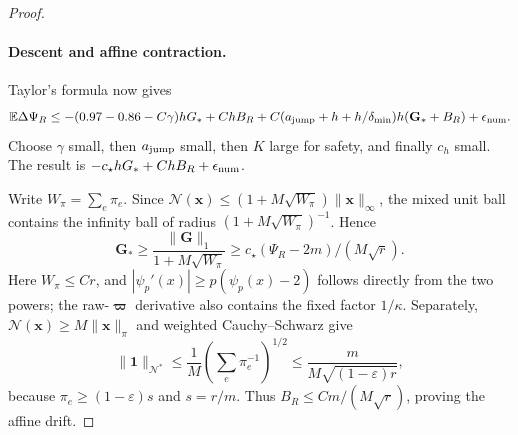 \documentclass[11pt]{article}
\theoremstyle{remark}
\newcommand{\vvp}{\boldsymbol{\varpi}}
\newcommand{\GG}{\mathbf G}
\newcommand{\xx}{\mathbf x}
\newcommand{\Ex}{\mathbb E}
\newcommand{\norm}[1]{\lVert#1\rVert}
\begin{document}
\begin{proof}
\paragraph{Descent and affine contraction.} Taylor's formula now gives
\[
 \Ex\Delta\Psi_R
 \le-(0.97-0.86-C\gamma)hG_*+ChB_R
      +C(a_{\rm jump}+h+h/\delta_{\min})h(\GG_*+B_R)
      +\epsilon_{\rm num}.
\]
Choose $\gamma$ small, then $a_{\rm jump}$ small, then $K$ large for safety, and
finally $c_h$ small.
The result is $-c_\star hG_*+C hB_R+\epsilon_{\rm num}$.

Write $W_\pi=\sum_e\pi_e$.
Since $\mathcal N(\xx)\le(1+M\sqrt{W_\pi})\norm{\xx}_\infty$, the mixed unit ball
contains the infinity ball of radius $(1+M\sqrt{W_\pi})^{-1}$.
Hence
\[
 \GG_*\ge\frac{\norm{\GG}_1}{1+M\sqrt{W_\pi}}
       \ge c_\star(\Psi_R-2m)/(M\sqrt r).
\]
Here $W_\pi\le Cr$, and $|\psi_p'(x)|\ge p(\psi_p(x)-2)$ follows directly from
the two powers; the raw-$\vvp$ derivative also contains the fixed factor
$1/\kappa$.
Separately, $\mathcal N(\xx)\ge M\norm{\xx}_\pi$ and weighted Cauchy--Schwarz give
\[
 \norm{\mathbf1}_{\mathcal N^*}
 \le\frac1M\left(\sum_e\pi_e^{-1}\right)^{1/2}
 \le\frac{m}{M\sqrt{(1-\varepsilon)r}},
\]
because $\pi_e\ge(1-\varepsilon)s$ and $s=r/m$.
Thus $B_R\le Cm/(M\sqrt r)$, proving the affine drift.


\end{proof}
\end{document}
